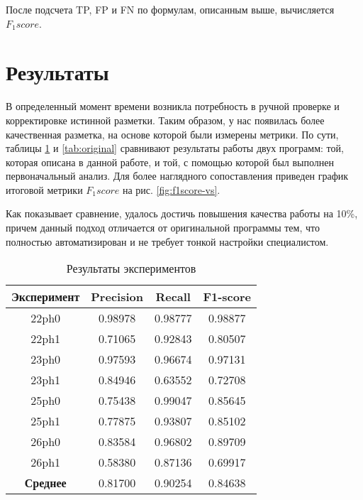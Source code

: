 После подсчета TP, FP и FN по формулам, описанным выше, вычисляется $F_1score$.

\section{Результаты}

В определенный момент времени возникла потребность в ручной проверке и
корректировке истинной разметки. Таким образом, у нас появилась более
качественная разметка, на основе которой были измерены метрики. По сути,
таблицы \ref{tab:results} и \ref{tab:original} сравнивают результаты работы
двух программ: той, которая описана в данной работе, и той, с помощью которой
был выполнен первоначальный анализ. Для более наглядного сопоставления приведен
график итоговой метрики $F_1score$ на рис. \ref{fig:f1score-vs}.

Как показывает сравнение, удалось достичь повышения качества работы на 10\%,
причем данный подход отличается от оригинальной программы тем, что полностью
автоматизирован и не требует тонкой настройки специалистом.

\begin{table}[!htb]
	\centering
	\caption{Результаты экспериментов}
	\label{tab:results}
	\begin{tabular}{@{}cccc@{}}
		\toprule
		\textbf{Эксперимент} & \textbf{Precision} & \textbf{Recall} & \textbf{F1-score} \\ \midrule
		22ph0                & 0.98978            & 0.98777         & 0.98877           \\
		22ph1                & 0.71065            & 0.92843         & 0.80507           \\
		23ph0                & 0.97593            & 0.96674         & 0.97131           \\
		23ph1                & 0.84946            & 0.63552         & 0.72708           \\
		25ph0                & 0.75438            & 0.99047         & 0.85645           \\
		25ph1                & 0.77875            & 0.93807         & 0.85102           \\
		26ph0                & 0.83584            & 0.96802         & 0.89709           \\
		26ph1                & 0.58380            & 0.87136         & 0.69917           \\ \midrule
		\textbf{Среднее}     & 0.81700            & 0.90254         & 0.84638           \\ \bottomrule
	\end{tabular}
\end{table}


